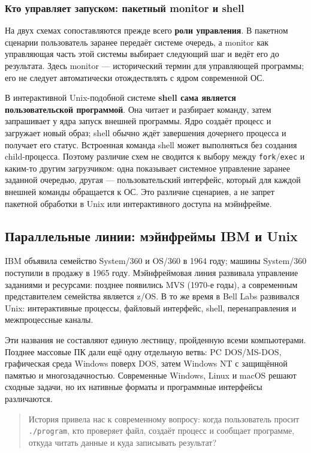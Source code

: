\subsubsection*{Кто управляет запуском: пакетный monitor и shell}

На двух схемах сопоставляются прежде всего \textbf{роли управления}. В
пакетном сценарии пользователь заранее передаёт системе очередь, а monitor как
управляющая часть этой системы выбирает следующий шаг и ведёт его до результата.
Здесь monitor --- исторический термин для управляющей программы; его не следует
автоматически отождествлять с ядром современной ОС.

В интерактивной Unix-подобной системе \textbf{shell сама является пользовательской
программой}. Она читает и разбирает команду, затем запрашивает у ядра запуск
внешней программы. Ядро создаёт процесс и загружает новый образ; shell обычно
ждёт завершения дочернего процесса и получает его статус. Встроенная команда
shell может выполняться без создания child-процесса. Поэтому различие схем не
сводится к выбору между \texttt{fork}/\texttt{exec} и каким-то другим
загрузчиком: одна показывает системное управление заранее заданной очередью,
другая --- пользовательский интерфейс, который для каждой внешней команды
обращается к ОС. Это различие сценариев, а не запрет пакетной обработки в Unix
или интерактивного доступа на мэйнфрейме.

\subsection*{Параллельные линии: мэйнфреймы IBM и Unix}

IBM объявила семейство System/360 и OS/360 в 1964 году; машины System/360
поступили в продажу в 1965 году. Мэйнфреймовая линия развивала управление
заданиями и ресурсами: позднее появились MVS (1970-е годы), а современным
представителем семейства является z/OS. В то же время в Bell Labs развивался
Unix: интерактивные процессы, файловый интерфейс, shell, перенаправления и
межпроцессные каналы.

Эти названия не составляют единую лестницу, пройденную всеми компьютерами.
Позднее массовые ПК дали ещё одну отдельную ветвь: PC DOS/MS-DOS, графическая
среда Windows поверх DOS, затем Windows NT с защищённой памятью и
многозадачностью. Современные Windows, Linux и macOS решают сходные задачи,
но их нативные форматы и программные интерфейсы различаются.

\begin{quote}
История привела нас к современному вопросу: когда пользователь просит
\texttt{./program}, кто проверяет файл, создаёт процесс и сообщает программе,
откуда читать данные и куда записывать результат?
\end{quote}

